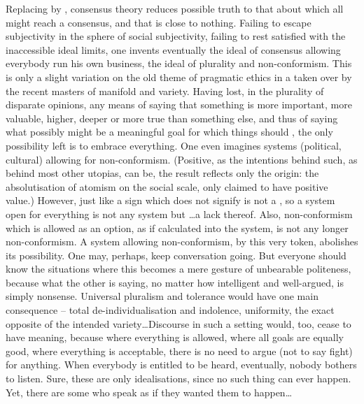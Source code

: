 Replacing  by , consensus theory reduces
possible truth to that about which all might reach a consensus, and that is
close to nothing.  Failing to escape  subjectivity in the sphere of
social subjectivity, failing to rest satisfied with the inaccessible ideal
limits, one invents eventually the ideal of consensus allowing everybody run his
own business, the ideal of plurality and non-conformism.
This is only a slight variation on the old theme of pragmatic ethics in a
 taken over by the recent masters of manifold and
variety.  Having lost, in the plurality of disparate opinions, any means of
saying that something is more important, more valuable, higher, deeper or more
true than something else, and thus of saying what possibly might be a meaningful
goal for which things should , the only possibility left is to embrace
everything.  One  even imagines systems (political, cultural) allowing for
non-conformism. (Positive, as the intentions behind such, as behind most other
utopias, can be, the result reflects only the origin: the absolutisation of
atomism on the social scale, only claimed to have positive value.) However, just
like a sign which does not signify is not a , so a system open for
everything is not any system but \ldots a lack thereof. Also, non-conformism
which is allowed as an option, as if calculated into the system, is not any
longer non-conformism.  A system allowing non-conformism, by this very token,
abolishes its possibility.  One may, perhaps, keep conversation going.  But
everyone should know the situations where this becomes a mere gesture of
unbearable politeness, because what the other is saying, no matter how
intelligent and well-argued, is simply nonsense.  Universal pluralism and
tolerance would have one main
consequence -- total de-individualisation and indolence, uniformity, the exact
opposite of the intended variety\ldots Discourse in such a setting would, too,
cease to have meaning, because where everything is allowed, where all goals are
equally good, where everything is acceptable, there is no need to argue (not to
say fight) for anything. When everybody is entitled to be heard, eventually,
nobody bothers to listen. Sure, these are only idealisations, since no such thing can ever happen.  Yet, there are some who speak as
if they wanted them to happen\ldots

